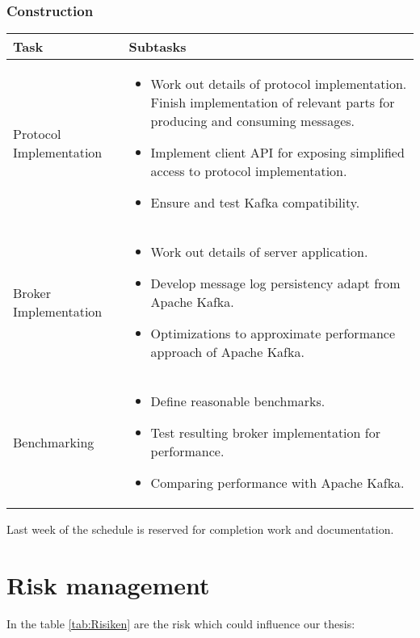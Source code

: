 \subsubsection*{Construction}
\begin{tabular}[H]{|p{6cm}|p{7.5cm}|}\hline
   \textbf{Task} & \textbf{Subtasks} \\ \hline
    Protocol Implementation &
        \begin{itemize}
            \item Work out details of protocol implementation. Finish
                implementation of relevant parts for producing and consuming
                messages. 
            \item Implement client API for exposing simplified access to protocol
                implementation.
            \item Ensure and test Kafka compatibility.
        \end{itemize} \\ \hline
    Broker Implementation &
        \begin{itemize}
            \item Work out details of server application.
            \item Develop message log persistency adapt from Apache Kafka. 
            \item Optimizations to approximate performance approach of
            Apache Kafka. 
        \end{itemize} \\ \hline
    Benchmarking &
        \begin{itemize}
            \item Define reasonable benchmarks.
            \item Test resulting broker implementation for performance.
            \item Comparing performance with Apache Kafka.
        \end{itemize} \\ \hline
\end{tabular}

Last week of the schedule is reserved for completion work and documentation. 

\newpage
\section*{Risk management}

In the table \ref{tab:Risiken} are the risk which could influence our thesis: 

